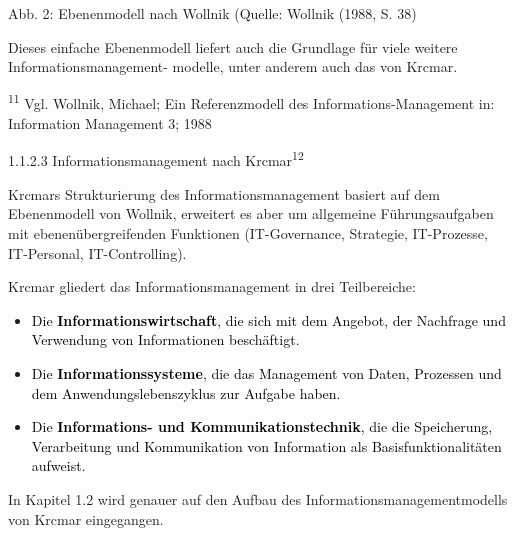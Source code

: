 \documentclass[a4paper]{article}
\newcommand\liststyleLii{%
\renewcommand\labelitemi{•}
\renewcommand\labelitemii{◦}
\renewcommand\labelitemiii{${\blacksquare}$}
\renewcommand\labelitemiv{•}
}
\begin{document}
\bigskip


\bigskip


\bigskip


\bigskip


\bigskip


\bigskip


\bigskip


\bigskip


\bigskip

{\centering\sffamily\color{black}
Abb. 2: Ebenenmodell nach Wollnik (Quelle: Wollnik (1988, S. 38)
\par}


\bigskip

{\sffamily\color{black}
Dieses einfache Ebenenmodell liefert auch die Grundlage für viele weitere Informationsmanagement- modelle, unter anderem
auch das von Krcmar.}


\bigskip

{\sffamily\color{black}
\textsuperscript{11 }Vgl. Wollnik, Michael; Ein Referenzmodell des Informations-Management in: Information Management 3;
1988 }

{\sffamily\color{black}
1.1.2.3 Informationsmanagement nach Krcmar\textsuperscript{12}\newline
}

{\sffamily\color{black}
Krcmars Strukturierung des Informationsmanagement basiert auf dem Ebenenmodell von Wollnik, erweitert es aber um
allgemeine Führungsaufgaben mit ebenenübergreifenden Funktionen (IT-Governance, Strategie, IT-Prozesse, IT-Personal,
IT-Controlling).}


\bigskip

{\sffamily\color{black}
Krcmar gliedert das Informationsmanagement in drei Teilbereiche:}


\bigskip

\liststyleLii
\begin{itemize}
\item {\sffamily
\textcolor{black}{Die }\textbf{\textcolor{black}{Informationswirtschaft}}\textcolor{black}{, die sich mit dem Angebot,
der Nachfrage und Verwendung von Informationen beschäftigt.}}
\item {\sffamily
\textcolor{black}{Die }\textbf{\textcolor{black}{Informationssysteme}}\textcolor{black}{, die das Management von Daten,
Prozessen und dem Anwendungslebenszyklus zur Aufgabe haben.}}
\item {\sffamily
\textcolor{black}{Die }\textbf{\textcolor{black}{Informations- und Kommunikationstechnik}}\textcolor{black}{, die die
Speicherung, Verarbeitung und Kommunikation von Information als Basisfunktionalitäten aufweist.}}


\bigskip
\end{itemize}
{\sffamily\color{black}
In Kapitel 1.2 wird genauer auf den Aufbau des Informationsmanagementmodells von Krcmar eingegangen.}
\end{document}
